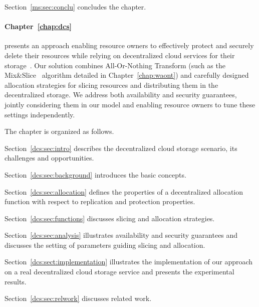 {\begin{compactitem}
	\item Section~\ref{ms:sec:conclu} concludes the chapter.
\end{compactitem}

\medskip

\paragraph*{Chapter~\ref{chap:dcs}}
presents an approach enabling resource owners to effectively protect and securely delete their resources while relying on decentralized cloud services for their storage~\cite{tifs,globecom}.
Our solution combines All-Or-Nothing Transform (such as the Mix\&Slice~\cite{ccs} algorithm detailed in Chapter~\ref{chap:waont}) and carefully designed allocation strategies for slicing resources and distributing them in the decentralized storage. We address both availability and security guarantees, jointly considering them in our model and enabling resource owners to tune these settings independently.

\smallskip
\noindent The chapter is organized as follows.

\begin{compactitem}
	\item Section~\ref{dcs:sec:intro} describes the decentralized cloud storage scenario, its challenges and opportunities.
	
	\item Section~\ref{dcs:sec:background} introduces the basic concepts.
	
	\item Section~\ref{dcs:sec:allocation} defines the properties of a decentralized allocation function with respect to replication and protection properties.
	
	\item Section~\ref{dcs:sec:functions} discusses slicing and allocation strategies.
	
	\item Section~\ref{dcs:sec:analysis} illustrates availability and security guarantees and discusses the setting of parameters guiding slicing and allocation.
	
	\item Section~\ref{dcs:sect:implementation} illustrates the implementation of our approach on a real decentralized cloud storage service and presents the experimental results.
	
	\item Section~\ref{dcs:sec:relwork} discusses related work.
	

\end{compactitem}}
